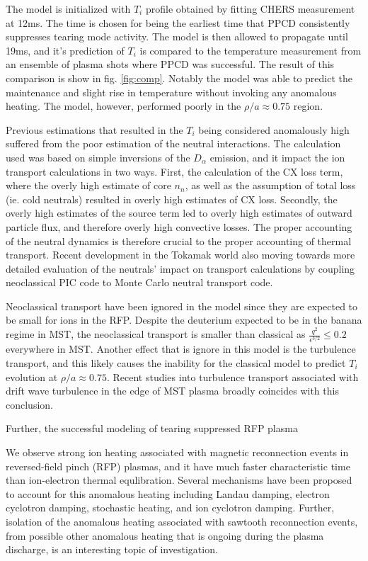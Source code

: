 \documentclass[aip, pop, preprint]{revtex4-1}
\begin{document}
The model is initialized with $T_i$ profile obtained by fitting CHERS measurement at 12ms. The time is chosen for being the earliest time that PPCD consistently suppresses tearing mode activity. The model is then allowed to propagate until 19ms, and it's prediction of $T_i$ is compared to the temperature measurement from an ensemble of plasma shots where PPCD was successful. The result of this comparison is show in fig. \ref{fig:comp}. Notably the model was able to predict the maintenance and slight rise in temperature without invoking any anomalous heating. The model, however, performed poorly in the $\rho /a \approx 0.75$ region.

Previous estimations that resulted in the $T_i$ being considered anomalously high suffered from the poor estimation of the neutral interactions\cite{Fiksel2006Confinement}. The calculation used was based on simple inversions of the $D_{\alpha}$ emission, and it impact the ion transport calculations in two ways. First, the calculation of the CX loss term, where the overly high estimate of core $n_n$, as well as the assumption of total loss (ie. cold neutrals) resulted in overly high estimates of CX loss. Secondly, the overly high estimates of the source term led to overly high estimates of outward particle flux, and therefore overly high convective losses. The proper accounting of the neutral dynamics is therefore crucial to the proper accounting of thermal transport. Recent development in the Tokamak world also moving towards more detailed evaluation of the neutrals' impact on transport calculations by coupling neoclassical PIC code to Monte Carlo neutral transport code\cite{Stotler2013PedestalCode}.

Neoclassical transport have been ignored in the model since they are expected to be small for ions in the RFP. Despite the deuterium expected to be in the banana regime\cite{Kumar12pop} in MST, the neoclassical transport is smaller than classical as $\frac{q^2}{\epsilon^{3/2}} \leq 0.2$ everywhere in MST. Another effect that is ignore in this model is the turbulence transport, and this likely causes the inability for the classical model to predict $T_i$ evolution at $\rho /a \approx 0.75$. Recent studies into turbulence transport associated with drift wave turbulence in the edge of MST plasma broadly coincides with this conclusion\cite{NishizawaPRL}.

Further, the successful modeling of tearing suppressed RFP plasma  

We observe strong ion heating associated with magnetic reconnection events in reversed-field pinch (RFP) plasmas\cite{Gangadhara08}, and it have much faster characteristic time than ion-electron thermal equlibration. Several mechanisms have been proposed to account for this anomalous heating including Landau damping, electron cyclotron damping, stochastic heating, and ion cyclotron damping\cite{Tangri08}. Further, isolation of the anomalous heating associated with sawtooth reconnection events, from possible other anomalous heating that is ongoing during the plasma discharge, is an interesting topic of investigation. 
\end{document}
